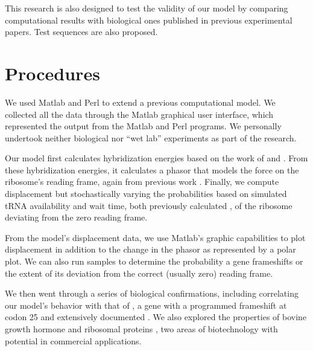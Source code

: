 \documentclass[article, oneside]{memoir}
\begin{document}
This research is also designed to test the validity of our model
by comparing computational results with biological ones published in previous
experimental papers.  Test sequences are also proposed.


\section{Procedures}
We used Matlab and Perl to extend a previous computational model. We
collected all the data through the Matlab graphical user interface,
which represented the output from the Matlab and Perl programs. We
personally undertook neither biological nor ``wet lab'' experiments as
part of the research.

Our model first calculates hybridization energies based on the work of
\citet{freier} and \citet{starmer}. From these hybridization energies,
it calculates a phasor that models the force on the ribosome's reading
frame, again from previous work \cite{lalit:mechanics}. Finally, we
compute displacement but stochastically varying the probabilities
based on simulated tRNA availability and wait time, both previously
calculated \cite{ikemura, lalit:mechanics}, of the ribosome deviating
from the zero reading frame.

From the model's displacement data, we use Matlab's graphic
capabilities to plot displacement in addition to the change in the
phasor as represented by a polar plot. We can also run samples to
determine the probability a gene frameshifts or the extent of its
deviation from the correct (usually zero) reading frame.

We then went through a series of biological confirmations, including
correlating our model's behavior with that of \prfB, a gene with a
programmed frameshift at codon 25 and extensively documented
\cite{weiss87}. We also explored the properties of bovine growth
hormone \cite{schoner:bgh} and ribosomal proteins \cite{rpoS:process},
two areas of biotechnology with potential in commercial applications.
\end{document}
